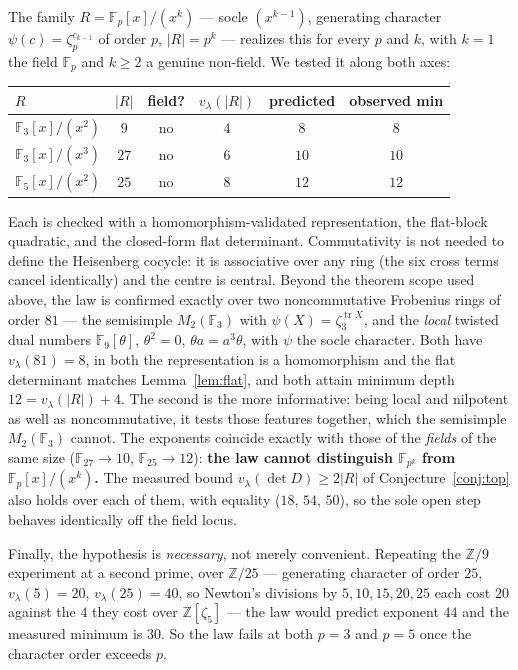 \documentclass[11pt]{article}
\theoremstyle{plain}
\theoremstyle{definition}
\newcommand{\FF}{\mathbb F}
\newcommand{\ZZ}{\mathbb Z}
\newcommand{\tr}{\operatorname{tr}}
\newcommand{\vlam}{v_\lambda}
\begin{document}
The family $R=\FF_p[x]/(x^k)$ --- socle $(x^{k-1})$, generating character
$\psi(c)=\zeta_p^{c_{k-1}}$ of order $p$, $|R|=p^k$ --- realizes this for every
$p$ and $k$, with $k=1$ the field $\FF_p$ and $k\ge2$ a genuine non-field. We
tested it along both axes:
\begin{center}
\begin{tabular}{@{}lccccc@{}}
\toprule
$R$ & $|R|$ & field? & $\vlam(|R|)$ & predicted & observed min\\
\midrule
$\FF_3[x]/(x^2)$ & $9$  & no & $4$ & $8$  & $8$\\
$\FF_3[x]/(x^3)$ & $27$ & no & $6$ & $10$ & $10$\\
$\FF_5[x]/(x^2)$ & $25$ & no & $8$ & $12$ & $12$\\
\bottomrule
\end{tabular}
\end{center}
Each is checked with a homomorphism-validated representation, the flat-block
quadratic, and the closed-form flat determinant. Commutativity is not needed
to define the Heisenberg cocycle: it is associative over any ring (the six
cross terms cancel identically) and the centre is central.  Beyond the theorem
scope used above, the law is confirmed exactly over two noncommutative
Frobenius rings of order $81$ --- the semisimple
$M_2(\FF_3)$ with $\psi(X)=\zeta_3^{\tr X}$, and the \emph{local} twisted dual
numbers $\FF_9[\theta]$, $\theta^2=0$, $\theta a=a^3\theta$, with $\psi$ the
socle character. Both have $\vlam(81)=8$, in both the representation is a
homomorphism and the flat determinant matches Lemma~\ref{lem:flat}, and both
attain minimum depth $12=\vlam(|R|)+4$. The second is the more informative:
being local and nilpotent as well as noncommutative, it tests those features
together, which the semisimple $M_2(\FF_3)$ cannot. The exponents coincide
exactly with those of the \emph{fields} of the same size ($\FF_{27}\to10$,
$\FF_{25}\to12$): \textbf{the law cannot distinguish $\FF_{p^k}$ from
$\FF_p[x]/(x^k)$.} The measured bound $\vlam(\det D)\ge2|R|$ of
Conjecture~\ref{conj:top} also holds over each of them, with equality
($18$, $54$, $50$), so the sole open step behaves identically off the field
locus.

Finally, the hypothesis is \emph{necessary}, not merely convenient. Repeating
the $\ZZ/9$ experiment at a second prime, over $\ZZ/25$ --- generating
character of order $25$, $\vlam(5)=20$, $\vlam(25)=40$, so Newton's divisions
by $5,10,15,20,25$ each cost $20$ against the $4$ they cost over
$\ZZ[\zeta_5]$ --- the law would predict exponent $44$ and the measured
minimum is $30$. So the law fails at both $p=3$ and $p=5$ once the character
order exceeds $p$.
\end{document}

